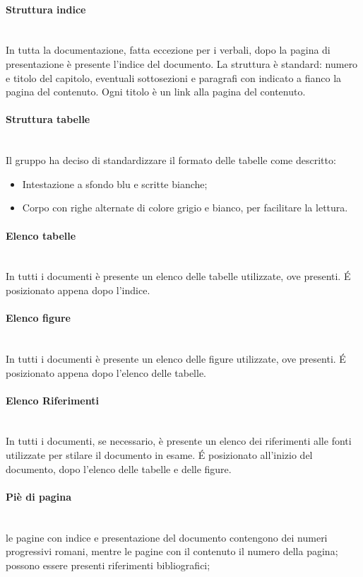 \paragraph{Struttura indice} \-\\
In tutta la documentazione, fatta eccezione per i verbali, dopo la pagina di presentazione è presente l'indice del documento. La struttura è standard: numero e titolo del capitolo, eventuali sottosezioni e paragrafi con indicato a fianco la pagina del contenuto. Ogni titolo è un link alla pagina del contenuto. 

\paragraph{Struttura tabelle} \-\\
Il gruppo ha deciso di standardizzare il formato delle tabelle come descritto:
\begin{itemize}
	\item Intestazione a sfondo blu e scritte bianche;
	\item Corpo con righe alternate di colore grigio e bianco, per facilitare la lettura.
\end{itemize}

\paragraph{Elenco tabelle} \-\\
In tutti i documenti è presente un elenco delle tabelle utilizzate, ove presenti. \'E posizionato appena dopo l'indice.  

\paragraph{Elenco figure} \-\\
In tutti i documenti è presente un elenco delle figure utilizzate, ove presenti. \'E posizionato appena dopo l'elenco delle tabelle.

\paragraph{Elenco Riferimenti} \-\\
In tutti i documenti, se necessario, è presente un elenco dei riferimenti alle fonti utilizzate per stilare il documento in esame. \'E posizionato all'inizio del documento, dopo l'elenco delle tabelle e delle figure.

\paragraph{Piè di pagina} \-\\ le pagine con indice e presentazione del documento contengono dei numeri progressivi romani, mentre le pagine con il contenuto il numero della pagina; possono essere presenti riferimenti bibliografici;

